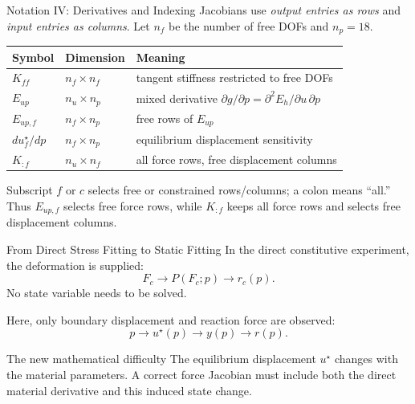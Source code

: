 \documentclass[aspectratio=169,10pt]{beamer}
\newcommand{\Kff}{K_{\!ff}}
\newcommand{\Eup}{E_{up}}
\newcommand{\Eupf}{E_{up,f}}
\begin{document}
\begin{frame}{Notation IV: Derivatives and Indexing}
  \small
  Jacobians use \emph{output entries as rows} and \emph{input entries as
  columns}. Let $n_f$ be the number of free DOFs and $n_p=18$.

  \begin{table}
    \centering
    \begin{tabular}{lll}
      \toprule
      Symbol & Dimension & Meaning \\
      \midrule
      $\Kff$ & $n_f\times n_f$ &
      tangent stiffness restricted to free DOFs \\
      $\Eup$ & $n_u\times n_p$ &
      mixed derivative $\partial g/\partial p
      =\partial^2E_h/\partial u\,\partial p$ \\
      $\Eupf$ & $n_f\times n_p$ &
      free rows of $\Eup$ \\
      $du_f^\star/dp$ & $n_f\times n_p$ &
      equilibrium displacement sensitivity \\
      $K_{:f}$ & $n_u\times n_f$ &
      all force rows, free displacement columns \\
      \bottomrule
    \end{tabular}
  \end{table}

  Subscript $f$ or $c$ selects free or constrained rows/columns; a colon
  means ``all.'' Thus $E_{up,f}$ selects free force rows, while $K_{:f}$
  keeps all force rows and selects free displacement columns.
\end{frame}

\begin{frame}{From Direct Stress Fitting to Static Fitting}
  \small
  In the direct constitutive experiment, the deformation is supplied:
  \[
    F_c
    \longrightarrow
    P(F_c;p)
    \longrightarrow
    r_c(p).
  \]
  No state variable needs to be solved.

  \vspace{0.6em}
  Here, only boundary displacement and reaction force are observed:
  \[
    p
    \longrightarrow
    u^\star(p)
    \longrightarrow
    y(p)
    \longrightarrow
    r(p).
  \]

  \begin{alertblock}{The new mathematical difficulty}
    The equilibrium displacement $u^\star$ changes with the material
    parameters.  A correct force Jacobian must include both the direct
    material derivative and this induced state change.
  \end{alertblock}
\end{frame}
\end{document}
